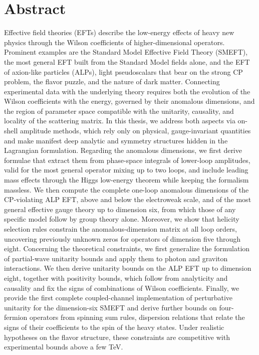 \chapter*{Abstract}

Effective field theories (EFTs) describe the low-energy effects of heavy new physics through the Wilson coefficients of higher-dimensional operators.
Prominent examples are the Standard Model Effective Field Theory (SMEFT), the most general EFT built from the Standard Model fields alone, and the EFT of axion-like particles (ALPs), light pseudoscalars that bear on the strong CP problem, the flavor puzzle, and the nature of dark matter.
Connecting experimental data with the underlying theory requires both the evolution of the Wilson coefficients with the energy, governed by their anomalous dimensions, and the region of parameter space compatible with the unitarity, causality, and locality of the scattering matrix.
In this thesis, we address both aspects via on-shell amplitude methods, which rely only on physical, gauge-invariant quantities and make manifest deep analytic and symmetry structures hidden in the Lagrangian formulation. 
Regarding the anomalous dimensions, we first derive formulae that extract them from phase-space integrals of lower-loop amplitudes, valid for the most general operator mixing up to two loops, and include leading mass effects through the Higgs low-energy theorem while keeping the formalism massless.
We then compute the complete one-loop anomalous dimensions of the CP-violating ALP EFT, above and below the electroweak scale, and of the most general effective gauge theory up to dimension six, from which those of any specific model follow by group theory alone. Moreover, we show that helicity selection rules constrain the anomalous-dimension matrix at all loop orders, uncovering previously unknown zeros for operators of dimension five through eight. 
Concerning the theoretical constraints, we first generalize the formulation of partial-wave unitarity bounds and apply them to photon and graviton interactions.
We then derive unitarity bounds on the ALP EFT up to dimension eight, together with positivity bounds, which follow from analyticity and causality and fix the signs of combinations of Wilson coefficients. 
Finally, we provide the first complete coupled-channel implementation of perturbative unitarity for the dimension-six SMEFT and derive further bounds on four-fermion operators from spinning sum rules, dispersion relations that relate the signs of their coefficients to the spin of the heavy states. Under realistic hypotheses on the flavor structure, these constraints are competitive with experimental bounds above a few TeV.
